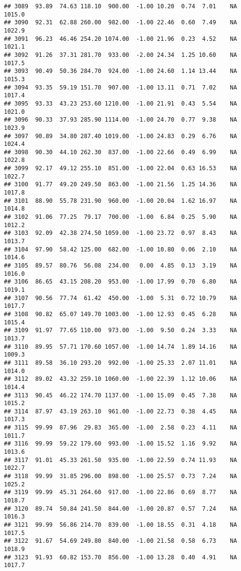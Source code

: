 \documentclass{article}\usepackage{graphicx, color}
\makeatletter
\newenvironment{kframe}{%
 \def\at@end@of@kframe{}%
 \ifinner\ifhmode%
  \def\at@end@of@kframe{\end{minipage}}%
  \begin{minipage}{\columnwidth}%
 \fi\fi%
 \def\FrameCommand##1{\hskip\@totalleftmargin \hskip-\fboxsep
 \colorbox{shadecolor}{##1}\hskip-\fboxsep
     \hskip-\linewidth \hskip-\@totalleftmargin \hskip\columnwidth}%
 \MakeFramed {\advance\hsize-\width
   \@totalleftmargin\z@ \linewidth\hsize
   \@setminipage}}%
 {\par\unskip\endMakeFramed%
 \at@end@of@kframe}
\newenvironment{knitrout}{}{} %
\makeatother
\begin{document}
\begin{knitrout}
\begin{kframe}
\begin{verbatim}
## 3089  93.89  74.63 118.10  900.00  -1.00 10.20  0.74  7.01    NA 1015.0
## 3090  92.31  62.88 260.00  982.00  -1.00 22.46  0.60  7.49    NA 1022.9
## 3091  96.23  46.46 254.20 1074.00  -1.00 21.96  0.23  4.52    NA 1021.1
## 3092  91.26  37.31 281.70  933.00  -2.00 24.34  1.25 10.60    NA 1017.5
## 3093  90.49  50.36 284.70  924.00  -1.00 24.60  1.14 13.44    NA 1015.3
## 3094  93.35  59.19 151.70  907.00  -1.00 13.11  0.71  7.02    NA 1017.4
## 3095  93.33  43.23 253.60 1210.00  -1.00 21.91  0.43  5.54    NA 1021.0
## 3096  90.33  37.93 285.90 1114.00  -1.00 24.70  0.77  9.38    NA 1023.9
## 3097  90.89  34.80 287.40 1019.00  -1.00 24.83  0.29  6.76    NA 1024.4
## 3098  90.30  44.10 262.30  837.00  -1.00 22.66  0.49  6.99    NA 1022.8
## 3099  92.17  49.12 255.10  851.00  -1.00 22.04  0.63 16.53    NA 1022.7
## 3100  91.77  49.20 249.50  863.00  -1.00 21.56  1.25 14.36    NA 1017.8
## 3101  88.90  55.78 231.90  960.00  -1.00 20.04  1.62 16.97    NA 1014.8
## 3102  91.06  77.25  79.17  700.00  -1.00  6.84  0.25  5.90    NA 1012.2
## 3103  92.09  42.38 274.50 1059.00  -1.00 23.72  0.97  8.43    NA 1013.7
## 3104  97.90  58.42 125.00  682.00  -1.00 10.80  0.06  2.10    NA 1014.6
## 3105  89.57  80.76  56.08  234.00   0.00  4.85  0.13  3.19    NA 1016.0
## 3106  86.65  43.15 208.20  953.00  -1.00 17.99  0.70  6.80    NA 1019.1
## 3107  90.56  77.74  61.42  450.00  -1.00  5.31  0.72 10.79    NA 1017.7
## 3108  90.82  65.07 149.70 1003.00  -1.00 12.93  0.45  6.28    NA 1015.4
## 3109  91.97  77.65 110.00  973.00  -1.00  9.50  0.24  3.33    NA 1013.7
## 3110  89.95  57.71 170.60 1057.00  -1.00 14.74  1.89 14.16    NA 1009.3
## 3111  89.58  36.10 293.20  992.00  -1.00 25.33  2.07 11.01    NA 1014.0
## 3112  89.02  43.32 259.10 1060.00  -1.00 22.39  1.12 10.06    NA 1014.4
## 3113  90.45  46.22 174.70 1137.00  -1.00 15.09  0.45  7.38    NA 1015.2
## 3114  87.97  43.19 263.10  961.00  -1.00 22.73  0.38  4.45    NA 1017.3
## 3115  99.99  87.96  29.83  365.00  -1.00  2.58  0.23  4.11    NA 1011.7
## 3116  99.99  59.22 179.60  993.00  -1.00 15.52  1.16  9.92    NA 1013.6
## 3117  91.01  45.33 261.50  935.00  -1.00 22.59  0.74 11.93    NA 1022.7
## 3118  99.99  31.85 296.00  898.00  -1.00 25.57  0.73  7.24    NA 1025.2
## 3119  99.99  45.31 264.60  917.00  -1.00 22.86  0.69  8.77    NA 1018.7
## 3120  89.74  50.84 241.50  844.00  -1.00 20.87  0.57  7.24    NA 1016.3
## 3121  99.99  56.86 214.70  839.00  -1.00 18.55  0.31  4.18    NA 1017.5
## 3122  91.67  54.69 249.80  840.00  -1.00 21.58  0.58  6.73    NA 1018.9
## 3123  91.93  60.82 153.70  856.00  -1.00 13.28  0.40  4.91    NA 1017.7

\end{verbatim}
\end{kframe}
\end{knitrout}
\end{document}
